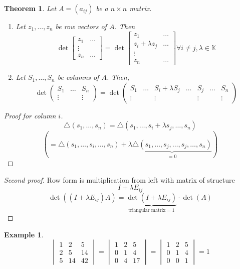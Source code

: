 \documentclass{article}
\newtheorem{theorem}{Theorem}  \numberwithin{theorem}{section}
\newtheorem{example}{Example}  \numberwithin{example}{section}
\begin{document}
\begin{theorem} %
  Let $A = (a_{ij})$ be a $n\times n$ matrix.
  \begin{enumerate}
    \item Let $z_1, \dots, z_n$ be row vectors of $A$. Then
      \[ \det\begin{bmatrix} z_1 & \ldots \\ \vdots & \\ z_n & \ldots \end{bmatrix} = \det\begin{bmatrix} z_1 & \ldots \\ z_i + \lambda z_j & \ldots \\ \vdots & \\ z_n & \ldots \end{bmatrix} \forall i \neq j, \lambda \in \mathbb K \]
    \item
      Let $S_1, \dots, S_n$ be columns of $A$. Then,
      \[ \det\begin{pmatrix} S_1 & \ldots & S_n \\ \vdots & & \vdots \end{pmatrix} = \det\begin{pmatrix} S_1 & \ldots & S_i + \lambda S_j & \ldots & S_j & \ldots & S_n \\ \vdots & & \vdots & & \vdots & & \vdots \end{pmatrix} \]
  \end{enumerate}
\end{theorem}
\begin{proof}[Proof for column $i$]
  \[ \triangle(s_1, \dots, s_n)= \triangle(s_1, \dots, s_i + \lambda s_j, \dots, s_n) \]
  \[ \left( = \triangle(s_1, \dots, s_i, \dots, s_n) + \lambda \underbrace{\triangle(s_1, \dots, s_j, \dots, s_j, \dots, s_n)}_{=0} \right) \]
\end{proof}
\begin{proof}[Second proof]
  Row form is multiplication from left with matrix of structure
  \[ I + \lambda E_{ij} \]
  \[ \det((I + \lambda E_{ij}) A) = \underbrace{\det(I + \lambda E_{ij})}_{\text{triangular matrix} = 1} \cdot \det(A) \]
\end{proof}
\begin{example} %
  \[
    \begin{vmatrix}
      1 & 2 & 5 \\
      2 & 5 & 14 \\
      5 & 14 & 42
    \end{vmatrix}
    =
    \begin{vmatrix}
      1 & 2 & 5 \\
      0 & 1 & 4 \\
      0 & 4 & 17
    \end{vmatrix}
    =
    \begin{vmatrix}
      1 & 2 & 5 \\
      0 & 1 & 4 \\
      0 & 0 & 1
    \end{vmatrix}
    = 1
  \]
\end{example}
\end{document}

